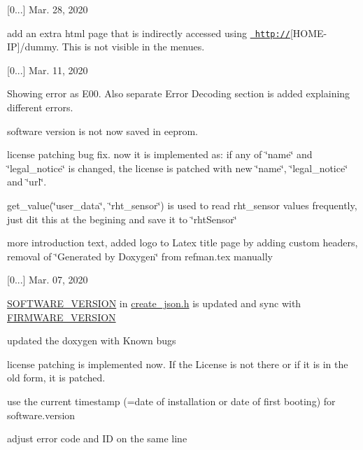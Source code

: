 \begin{DoxyItemize}
\item \mbox{[}0...\mbox{]} Mar. 28, 2020
\begin{DoxyItemize}
\item add an extra html page that is indirectly accessed using \href{http://}{\texttt{ http\+://}}\mbox{[}H\+O\+M\+E-\/\+IP\mbox{]}/dummy. This is not visible in the menues.
\end{DoxyItemize}
\item \mbox{[}0...\mbox{]} Mar. 11, 2020
\begin{DoxyItemize}
\item Showing error as E00. Also separate Error Decoding section is added explaining different errors.
\item software version is not now saved in eeprom.
\item license patching bug fix. now it is implemented as\+: if any of \char`\"{}name\char`\"{} and \char`\"{}legal\+\_\+notice\char`\"{} is changed, the license is patched with new \char`\"{}name\char`\"{}, \char`\"{}legal\+\_\+notice\char`\"{} and \char`\"{}url\char`\"{}.
\item get\+\_\+value(\char`\"{}user\+\_\+data\char`\"{}, \char`\"{}rht\+\_\+sensor\char`\"{}) is used to read rht\+\_\+sensor values frequently, just dit this at the begining and save it to \char`\"{}rht\+Sensor\char`\"{}
\item more introduction text, added logo to Latex title page by adding custom headers, removal of \char`\"{}\+Generated by Doxygen\char`\"{} from refman.\+tex manually
\end{DoxyItemize}
\item \mbox{[}0...\mbox{]} Mar. 07, 2020
\begin{DoxyItemize}
\item \mbox{\hyperlink{create__json_8h_ab1d2a71062488a1b8d2f9129682a42b9}{S\+O\+F\+T\+W\+A\+R\+E\+\_\+\+V\+E\+R\+S\+I\+ON}} in \mbox{\hyperlink{create__json_8h}{create\+\_\+json.\+h}} is updated and sync with \mbox{\hyperlink{main_8h_aa14dc39d52ab121ceb570f1a265385e0}{F\+I\+R\+M\+W\+A\+R\+E\+\_\+\+V\+E\+R\+S\+I\+ON}}
\item updated the doxygen with Known bugs
\item license patching is implemented now. If the License is not there or if it is in the old form, it is patched.
\item use the current timestamp (=date of installation or date of first booting) for software.\+version
\item adjust error code and ID on the same line

\end{DoxyItemize}
\end{DoxyItemize}
